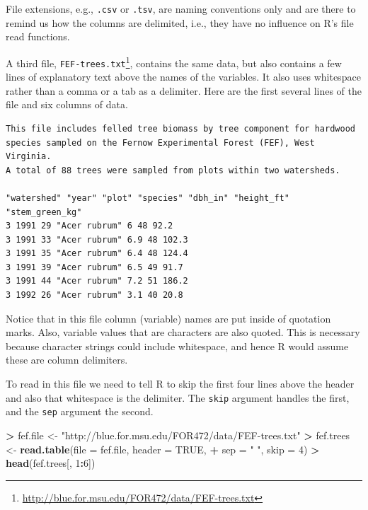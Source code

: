 \documentclass[]{krantz}
\makeatletter
\newenvironment{Shaded}{\begin{snugshade}}{\end{snugshade}}
\newcommand{\KeywordTok}[1]{\textcolor[rgb]{0.27,0.27,0.27}{\textbf{#1}}}
\newcommand{\DataTypeTok}[1]{\textcolor[rgb]{0.27,0.27,0.27}{#1}}
\newcommand{\DecValTok}[1]{\textcolor[rgb]{0.06,0.06,0.06}{#1}}
\newcommand{\StringTok}[1]{\textcolor[rgb]{0.5,0.5,0.5}{#1}}
\newcommand{\OtherTok}[1]{\textcolor[rgb]{0.37,0.37,0.37}{#1}}
\newcommand{\OperatorTok}[1]{\textcolor[rgb]{0.43,0.43,0.43}{\textbf{#1}}}
\newcommand{\NormalTok}[1]{#1}
\renewcommand{\href}[2]{#2\footnote{\url{#1}}}
\newenvironment{kframe}{%
\medskip{}
\setlength{\fboxsep}{.8em}
 \def\at@end@of@kframe{}%
 \ifinner\ifhmode%
  \def\at@end@of@kframe{\end{minipage}}%
  \begin{minipage}{\columnwidth}%
 \fi\fi%
 \def\FrameCommand##1{\hskip\@totalleftmargin \hskip-\fboxsep
 \colorbox{shadecolor}{##1}\hskip-\fboxsep
     \hskip-\linewidth \hskip-\@totalleftmargin \hskip\columnwidth}%
 \MakeFramed {\advance\hsize-\width
   \@totalleftmargin\z@ \linewidth\hsize
   \@setminipage}}%
 {\par\unskip\endMakeFramed%
 \at@end@of@kframe}
\renewenvironment{Shaded}{\begin{kframe}}{\end{kframe}}
\theoremstyle{definition}
\theoremstyle{definition}
\theoremstyle{definition}
\theoremstyle{remark}
\makeatother
\begin{document}
File extensions, e.g., \texttt{.csv} or \texttt{.tsv}, are naming
conventions only and are there to remind us how the columns are
delimited, i.e., they have no influence on R's file read functions.

A third file,
\href{http://blue.for.msu.edu/FOR472/data/FEF-trees.txt}{\texttt{FEF-trees.txt}},
contains the same data, but also contains a few lines of explanatory
text above the names of the variables. It also uses whitespace rather
than a comma or a tab as a delimiter. Here are the first several lines
of the file and six columns of data.

\begin{verbatim}
This file includes felled tree biomass by tree component for hardwood 
species sampled on the Fernow Experimental Forest (FEF), West Virginia. 
A total of 88 trees were sampled from plots within two watersheds. 

"watershed" "year" "plot" "species" "dbh_in" "height_ft" "stem_green_kg"
3 1991 29 "Acer rubrum" 6 48 92.2
3 1991 33 "Acer rubrum" 6.9 48 102.3
3 1991 35 "Acer rubrum" 6.4 48 124.4
3 1991 39 "Acer rubrum" 6.5 49 91.7
3 1991 44 "Acer rubrum" 7.2 51 186.2
3 1992 26 "Acer rubrum" 3.1 40 20.8
\end{verbatim}

Notice that in this file column (variable) names are put inside of
quotation marks. Also, variable values that are characters are also
quoted. This is necessary because character strings could include
whitespace, and hence R would assume these are column delimiters.

To read in this file we need to tell R to skip the first four lines
above the header and also that whitespace is the delimiter. The
\texttt{skip} argument handles the first, and the \texttt{sep} argument
the second.

\begin{Shaded}
\begin{Highlighting}[]
\OperatorTok{>}\StringTok{ }\NormalTok{fef.file <-}\StringTok{ "http://blue.for.msu.edu/FOR472/data/FEF-trees.txt"}
\OperatorTok{>}\StringTok{ }\NormalTok{fef.trees <-}\StringTok{ }\KeywordTok{read.table}\NormalTok{(}\DataTypeTok{file =}\NormalTok{ fef.file, }\DataTypeTok{header =} \OtherTok{TRUE}\NormalTok{, }
\OperatorTok{+}\StringTok{   }\DataTypeTok{sep =} \StringTok{" "}\NormalTok{, }\DataTypeTok{skip =} \DecValTok{4}\NormalTok{)}
\OperatorTok{>}\StringTok{ }\KeywordTok{head}\NormalTok{(fef.trees[, }\DecValTok{1}\OperatorTok{:}\DecValTok{6}\NormalTok{])}
\end{Highlighting}
\end{Shaded}
\end{document}
